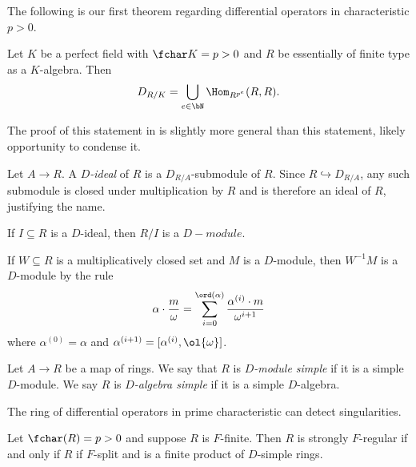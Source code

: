 The following is our first theorem regarding differential operators in characteristic $p > 0$.

\begin{thm}\label{thm:perfect-field-diff-op}
	Let $K$ be a perfect field with $\fchar K = p > 0$ and $R$ be essentially of finite type as a $K$-algebra. Then
	\begin{align*}
		D_{R/K} = \bigcup_{e\in \bN} \Hom_{R^{p^e}}(R,R).
	\end{align*}
\end{thm}
\begin{prf}
	The proof of this statement in \cite{amon92} is slightly more general than this statement, likely opportunity to condense it.
\end{prf}

\begin{defn}\label{defn:D-ideal}
	Let $A\to R$. A \emph{$D$-ideal} of $R$ is a $D_{R/A}$-submodule of $R$. Since $R \hookrightarrow D_{R/A}$, any such submodule is closed under multiplication by $R$ and is therefore an ideal of $R$, justifying the name.
\end{defn}

\begin{example}\label{ex:quotient-is-d-mod}
	If $I \subseteq R$ is a $D$-ideal, then $R/I$ is a $D-module$.
\end{example}

\begin{prop}\label{prop:localization-of-D-mod}
	If $W \subseteq R$ is a multiplicatively closed set and $M$ is a $D$-module, then $W^{-1}M$ is a $D$-module by the rule
	\begin{align*}
		\alpha\cdot \frac{m}{\omega} = \sum_{i = 0}^{\ord(\alpha)} \frac{\alpha^{(i)}\cdot m}{\omega^{i+1}}
	\end{align*}
	where $\alpha^{(0)} = \alpha$ and $\alpha^{(i+1)} = [\alpha^{(i)}, \ol{\omega}]$.
\end{prop}

\begin{defn}\label{defn:D-module-simple}
	Let $A\to R$ be a map of rings. We say that $R$ is \emph{$D$-module simple} if it is a simple $D$-module. We say $R$ is \emph{$D$-algebra simple} if it is a simple $D$-algebra.
\end{defn}

The ring of differential operators in prime characteristic can detect singularities. 

\begin{thm}\label{thm:strongly-F-regular-rings-D-simple}
	Let $\fchar(R) = p > 0$ and suppose $R$ is $F$-finite. Then $R$ is strongly $F$-regular if and only if $R$ if $F$-split and is a finite product of $D$-simple rings.
\end{thm}

\newpage
\printbibliography

